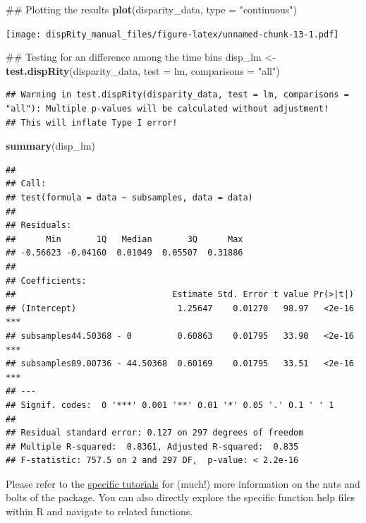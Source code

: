 \documentclass[]{book}
\newenvironment{Shaded}{\begin{snugshade}}{\end{snugshade}}
\newcommand{\KeywordTok}[1]{\textcolor[rgb]{0.13,0.29,0.53}{\textbf{#1}}}
\newcommand{\DataTypeTok}[1]{\textcolor[rgb]{0.13,0.29,0.53}{#1}}
\newcommand{\StringTok}[1]{\textcolor[rgb]{0.31,0.60,0.02}{#1}}
\newcommand{\NormalTok}[1]{#1}
\theoremstyle{definition}
\theoremstyle{definition}
\theoremstyle{remark}
\begin{document}
\begin{Shaded}
\begin{Highlighting}[]
\NormalTok{## Plotting the results}
\KeywordTok{plot}\NormalTok{(disparity_data, }\DataTypeTok{type =} \StringTok{"continuous"}\NormalTok{)}
\end{Highlighting}
\end{Shaded}

\texttt{[image: dispRity\_manual\_files/figure-latex/unnamed-chunk-13-1.pdf]}

\begin{Shaded}
\begin{Highlighting}[]
\NormalTok{## Testing for an difference among the time bins}
\NormalTok{disp_lm <-}\StringTok{ }\KeywordTok{test.dispRity}\NormalTok{(disparity_data, }\DataTypeTok{test =}\NormalTok{ lm, }\DataTypeTok{comparisons =} \StringTok{"all"}\NormalTok{)}
\end{Highlighting}
\end{Shaded}

\begin{verbatim}
## Warning in test.dispRity(disparity_data, test = lm, comparisons = "all"): Multiple p-values will be calculated without adjustment!
## This will inflate Type I error!
\end{verbatim}

\begin{Shaded}
\begin{Highlighting}[]
\KeywordTok{summary}\NormalTok{(disp_lm)}
\end{Highlighting}
\end{Shaded}

\begin{verbatim}
## 
## Call:
## test(formula = data ~ subsamples, data = data)
## 
## Residuals:
##      Min       1Q   Median       3Q      Max 
## -0.56623 -0.04160  0.01049  0.05507  0.31886 
## 
## Coefficients:
##                               Estimate Std. Error t value Pr(>|t|)    
## (Intercept)                    1.25647    0.01270   98.97   <2e-16 ***
## subsamples44.50368 - 0         0.60863    0.01795   33.90   <2e-16 ***
## subsamples89.00736 - 44.50368  0.60169    0.01795   33.51   <2e-16 ***
## ---
## Signif. codes:  0 '***' 0.001 '**' 0.01 '*' 0.05 '.' 0.1 ' ' 1
## 
## Residual standard error: 0.127 on 297 degrees of freedom
## Multiple R-squared:  0.8361, Adjusted R-squared:  0.835 
## F-statistic: 757.5 on 2 and 297 DF,  p-value: < 2.2e-16
\end{verbatim}

Please refer to the \protect\hyperlink{specific-tutorial}{specific
tutorials} for (much!) more information on the nuts and bolts of the
package. You can also directly explore the specific function help files
within R and navigate to related functions.
\end{document}
